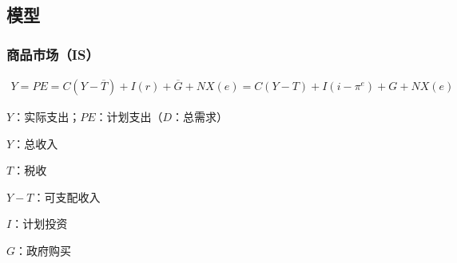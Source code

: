 \documentclass[12pt]{book}
\begin{document}
\subsection{模型}

\subsubsection{商品市场（IS）}

\begin{gather*}
    Y=PE=C(Y-\overline{T} )+I (r)+\overline{G}+NX(e)=C(Y-T)+I(i-\pi^e)+G+NX(e)
\end{gather*}
\par $Y$：实际支出；$PE$：计划支出（$D$：总需求）
\par $Y$：总收入
\par $T$：税收
\par $Y-T$：可支配收入
\par $I$：计划投资
\par $G$：政府购买
\end{document}
